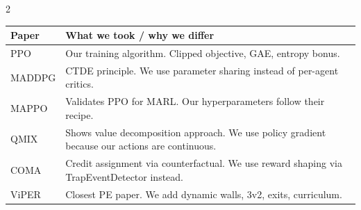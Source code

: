\documentclass[10pt,a4paper]{article}
\begin{document}
\begin{multicols}{2}
\begin{tabular}{@{}p{2cm}p{5.5cm}@{}}
\toprule
\textbf{Paper} & \textbf{What we took / why we differ} \\
\midrule
PPO & Our training algorithm. Clipped objective, GAE, entropy bonus. \\
MADDPG & CTDE principle. We use parameter sharing instead of per-agent critics. \\
MAPPO & Validates PPO for MARL. Our hyperparameters follow their recipe. \\
QMIX & Shows value decomposition approach. We use policy gradient because our actions are continuous. \\
COMA & Credit assignment via counterfactual. We use reward shaping via TrapEventDetector instead. \\
ViPER & Closest PE paper. We add dynamic walls, 3v2, exits, curriculum. \\
\bottomrule
\end{tabular}

\end{multicols}
\end{document}
